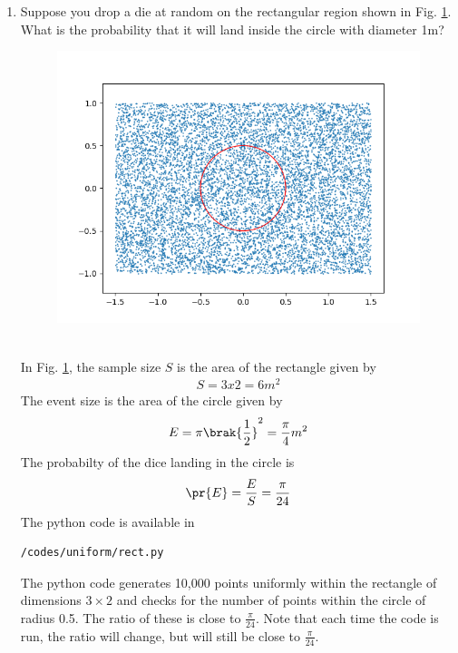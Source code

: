\renewcommand{\theequation}{\theenumi}
\renewcommand{\thefigure}{\theenumi}
\begin{enumerate}[label=\thesection.\arabic*.,ref=\thesection.\theenumi]
%
\item Suppose you drop a die at random on the rectangular region shown in Fig. \ref{fig:chapters/uniform/1/}. What is the probability that it will land inside the circle with diameter 1m?
\begin{figure}[!ht]
\centering
\includegraphics[width=\columnwidth]{./figs/uniform/rectangle.png}
\caption{}
\label{fig:chapters/uniform/1/}
\end{figure}
\\
\solution
In Fig. \ref{fig:chapters/uniform/1/}, the sample size $S$ is the area of the rectangle given by 
\begin{align}
S=3x2=6 m^2
\end{align}
The event size is the area of the circle given by 
\begin{align}
E = \pi\brak{\frac{1}{2}}^2=\frac{\pi}{4} m^2 
\end{align}
The probabilty of the dice landing in the circle is
\begin{align}
\pr{E} = \frac{E}{S} = \frac{\pi}{24}
\label{eq:chapters/uniform/1/prob}
\end{align}
%
The python code is available in 
\begin{lstlisting}
/codes/uniform/rect.py
\end{lstlisting}
The python code generates 10,000 points uniformly within the rectangle of dimensions $3 \times 2$ and checks for the number of points within the circle of radius 0.5.  The ratio of these is close to $\frac{\pi}{24}$.  Note that each time the code is run, the ratio will change, but will still be close to $\frac{\pi}{24}$.

%


\end{enumerate}
